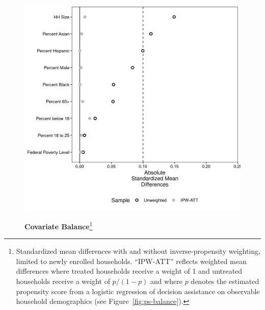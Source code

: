\documentclass[12pt]{article}
\begin{document}
\newpage
\begin{figure}[htb]
\centering
\footnotesize
\begin{minipage}[h]{6in}
\caption[caption]{\textbf{Covariate Balance}\footnote{Standardized mean differences with and without inverse-propensity weighting, limited to newly enrolled households. ``IPW-ATT'' reflects weighted mean differences where treated households receive a weight of 1 and untreated households receive a weight of $p/(1-p)$ and where $p$ denotes the estimated propensity score from a logistic regression of decision assistance on observable household demographics (see Figure~\ref{fig:ps-balance}).}}
\centerline{%
    \includegraphics[scale=0.75]{figures/cov_balance.png}
}
\label{fig:cov-balance}
\end{minipage}
\end{figure}
\end{document}
